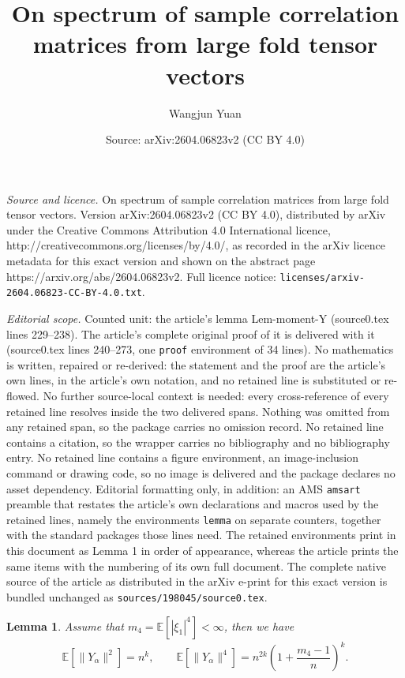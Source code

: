 \documentclass[10pt,a4paper]{amsart}
\title{On spectrum of sample correlation matrices from large fold tensor vectors}
\author{Wangjun Yuan}
\date{Source: arXiv:2604.06823v2 (CC BY 4.0)}
\newtheorem{lemma}{Lemma}
\def\bE{\mathbb E}
\begin{document}
\maketitle

\noindent\emph{Source and licence.} On spectrum of sample correlation matrices from large fold tensor vectors. Version arXiv:2604.06823v2 (CC BY 4.0), distributed by arXiv under the Creative Commons Attribution 4.0 International licence, http://creativecommons.org/licenses/by/4.0/, as recorded in the arXiv licence metadata for this exact version and shown on the abstract page https://arxiv.org/abs/2604.06823v2. Full licence notice: \texttt{licenses/arxiv-2604.06823-CC-BY-4.0.txt}.\par\smallskip

\noindent\textit{Editorial scope.} Counted unit: the article's lemma Lem-moment-Y (source0.tex lines 229--238). The article's complete original proof of it is delivered with it (source0.tex lines 240--273, one \texttt{proof} environment of 34 lines). No mathematics is written, repaired or re-derived: the statement and the proof are the article's own lines, in the article's own notation, and no retained line is substituted or re-flowed.  No further source-local context is needed: every cross-reference of every retained line resolves inside the two delivered spans.  Nothing was omitted from any retained span, so the package carries no omission record.  No retained line contains a citation, so the wrapper carries no bibliography and no bibliography entry.  No retained line contains a figure environment, an image-inclusion command or drawing code, so no image is delivered and the package declares no asset dependency.  Editorial formatting only, in addition: an AMS \texttt{amsart} preamble that restates the article's own declarations and macros used by the retained lines, namely the environments \texttt{lemma} on separate counters, together with the standard packages those lines need.  The retained environments print in this document as Lemma 1 in order of appearance, whereas the article prints the same items with the numbering of its own full document.  The complete native source of the article as distributed in the arXiv e-print for this exact version is bundled unchanged as \texttt{sources/198045/source0.tex}.
\begin{lemma} \label{Lem-moment-Y}
Assume that $m_4 = \bE[|\xi_1|^4] < \infty$, then we have
\begin{align*}
    \bE \left[ \|Y_\alpha\|^2 \right]
    = n^k,
    \quad \quad
    \bE \left[ \|Y_\alpha\|^4 \right]
    = n^{2k} \left( 1 + \dfrac{m_4-1}{n} \right)^k.
\end{align*}
\end{lemma}
\end{document}
